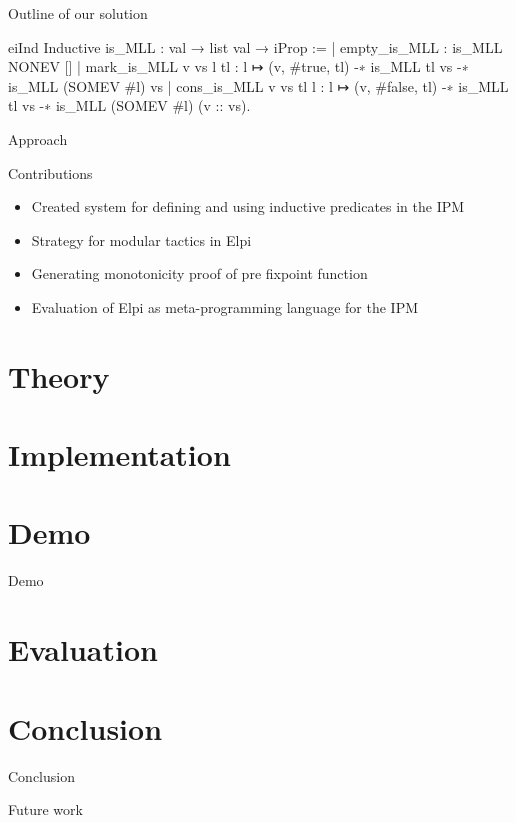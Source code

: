 \documentclass[aspectratio=169]{beamer}
\begin{document}
\begin{frame}[fragile]{Outline of our solution}
    \begin{coqcode}
        eiInd
        Inductive is_MLL : val → list val → iProp :=
            | empty_is_MLL : is_MLL NONEV []
            | mark_is_MLL v vs l tl : 
              l ↦ (v, #true, tl) -∗ is_MLL tl vs -∗ 
              is_MLL (SOMEV #l) vs
            | cons_is_MLL v vs tl l : 
              l ↦ (v, #false, tl) -∗ is_MLL tl vs -∗ 
              is_MLL (SOMEV #l) (v :: vs).
      \end{coqcode}
\end{frame}

\begin{frame}{Approach}

\end{frame}

\begin{frame}{Contributions}
    \begin{itemize}
        \item Created system for defining and using inductive predicates in the IPM
        \item Strategy for modular tactics in Elpi
        \item Generating monotonicity proof of pre fixpoint function
        \item Evaluation of Elpi as meta-programming language for the IPM
    \end{itemize}
\end{frame}

\section{Theory}

\section{Implementation}

\section{Demo}
\begin{frame}{Demo}

\end{frame}

\section{Evaluation}

\section{Conclusion}
\begin{frame}{Conclusion}

\end{frame}

\begin{frame}{Future work}

\end{frame}
\end{document}
